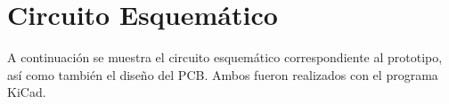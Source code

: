 \section{Circuito Esquemático}
A continuación se muestra el circuito esquemático correspondiente al prototipo, así como también el diseño del PCB. Ambos fueron realizados con el programa KiCad.\\
 
